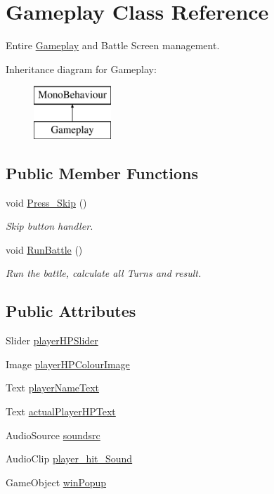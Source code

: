 \hypertarget{class_gameplay}{}\section{Gameplay Class Reference}
\label{class_gameplay}


Entire \mbox{\hyperlink{class_gameplay}{Gameplay}} and Battle Screen management.  


Inheritance diagram for Gameplay\+:\begin{figure}[H]
\begin{center}
\leavevmode
\includegraphics[height=2.000000cm]{class_gameplay}
\end{center}
\end{figure}
\subsection*{Public Member Functions}
\begin{DoxyCompactItemize}
\item 
void \mbox{\hyperlink{class_gameplay_af68b4ea2b131c1c77a5daf9c5a0b5b5e}{Press\+\_\+\+Skip}} ()
\begin{DoxyCompactList}\small\item\em Skip button handler. \end{DoxyCompactList}\item 
void \mbox{\hyperlink{class_gameplay_a314779fdcab62c148dbf587aa0ab4f67}{Run\+Battle}} ()
\begin{DoxyCompactList}\small\item\em Run the battle, calculate all Turns and result. \end{DoxyCompactList}\end{DoxyCompactItemize}
\subsection*{Public Attributes}
\begin{DoxyCompactItemize}
\item 
Slider \mbox{\hyperlink{class_gameplay_a5849feccd3e55e9a56fb8d01de6cb2b0}{player\+H\+P\+Slider}}
\item 
Image \mbox{\hyperlink{class_gameplay_afd46687c13f38631ec21871bf9ac84bb}{player\+H\+P\+Colour\+Image}}
\item 
Text \mbox{\hyperlink{class_gameplay_a1ab2fc541d3ded07b45440f1c10d1cd5}{player\+Name\+Text}}
\item 
Text \mbox{\hyperlink{class_gameplay_add500df8b9f20ace05c1fd087f4d8911}{actual\+Player\+H\+P\+Text}}
\item 
Audio\+Source \mbox{\hyperlink{class_gameplay_a8d3cada851038cf7cd7a3b3f25b400bb}{soundsrc}}
\item 
Audio\+Clip \mbox{\hyperlink{class_gameplay_a0a1fc8bb201acba72d595d49ac04039e}{player\+\_\+hit\+\_\+\+Sound}}
\item 
Game\+Object \mbox{\hyperlink{class_gameplay_ab3a83b9c136b94d0633708b8366b71c4}{win\+Popup}}
\end{DoxyCompactItemize}
